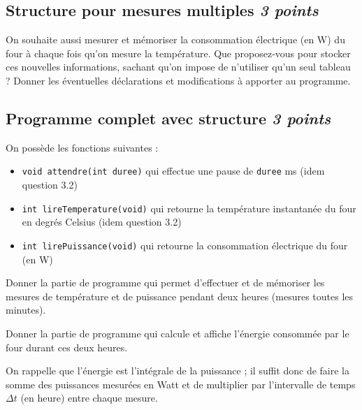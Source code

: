 \subsection{Structure pour mesures multiples \hfill \textit{3 points}}

On souhaite aussi mesurer et mémoriser la consommation électrique (en \si{W}) du four à chaque fois qu'on mesure la température.
\UPSTIquestion
Que proposez-vous pour stocker ces nouvelles informations, sachant qu'on impose de n'utiliser qu'un seul tableau ?
\UPSTIquestion
Donner les éventuelles déclarations et modifications à apporter au programme.

\espaceReponse{4cm}

\subsection{Programme complet avec structure \hfill \textit{3 points}}

On possède les fonctions suivantes :
\begin{itemize}
    \item \texttt{void attendre(int duree)} qui effectue une pause de \texttt{duree} ms (idem question 3.2)
    \item \texttt{int lireTemperature(void)} qui retourne la température instantanée du four en degrés Celsius (idem question 3.2)
    \item \texttt{int lirePuissance(void)} qui retourne la consommation électrique du four (en \si{W})
\end{itemize}

\UPSTIquestion
Donner la partie de programme qui permet d'effectuer et de mémoriser les mesures de température et de puissance pendant deux heures (mesures toutes les minutes).

\espaceReponse{5cm}

\UPSTIquestion
Donner la partie de programme qui calcule et affiche l'énergie consommée par le four durant ces deux heures. 

On rappelle que l'énergie est l'intégrale de la puissance ; il suffit donc de faire la somme des puissances mesurées en Watt et de multiplier par l'intervalle de temps $\Delta t$ (en heure) entre chaque mesure.


\espaceReponse{5cm}
